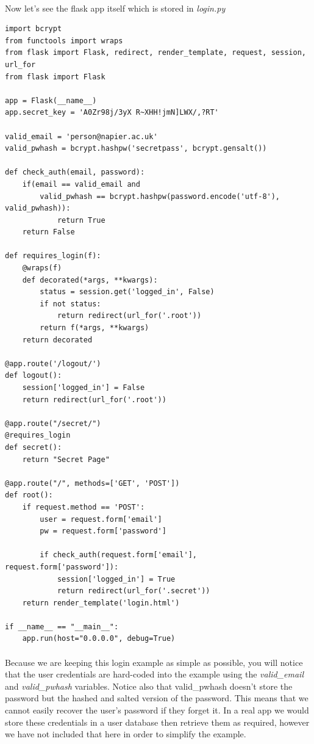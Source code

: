 \documentclass[12pt, a4paper, twoside]{book}
\begin{document}
\paragraph{} Now let's see the flask app itself which is stored in \emph{login.py}

\begin{lstlisting}
import bcrypt
from functools import wraps
from flask import Flask, redirect, render_template, request, session, url_for
from flask import Flask

app = Flask(__name__)
app.secret_key = 'A0Zr98j/3yX R~XHH!jmN]LWX/,?RT'

valid_email = 'person@napier.ac.uk'
valid_pwhash = bcrypt.hashpw('secretpass', bcrypt.gensalt())

def check_auth(email, password):
    if(email == valid_email and 
        valid_pwhash == bcrypt.hashpw(password.encode('utf-8'), valid_pwhash)):
            return True
    return False

def requires_login(f):
    @wraps(f)
    def decorated(*args, **kwargs):
        status = session.get('logged_in', False)
        if not status:
            return redirect(url_for('.root'))
        return f(*args, **kwargs)
    return decorated

@app.route('/logout/')
def logout():
    session['logged_in'] = False
    return redirect(url_for('.root'))

@app.route("/secret/")
@requires_login
def secret():
    return "Secret Page"

@app.route("/", methods=['GET', 'POST'])
def root():
    if request.method == 'POST':
        user = request.form['email']
        pw = request.form['password']
        
        if check_auth(request.form['email'], request.form['password']):
            session['logged_in'] = True
            return redirect(url_for('.secret'))
    return render_template('login.html')

if __name__ == "__main__":
    app.run(host="0.0.0.0", debug=True)
\end{lstlisting}

\paragraph{} Because we are keeping this login example as simple as possible, you will notice that the user credentials are hard-coded into the example using the \emph{valid\_email} and \emph{valid\_pwhash} variables. Notice also that valid\_pwhash doesn't store the password but the hashed and salted version of the password. This means that we cannot easily recover the user's password if they forget it. In a real app we would store these credentials in a user database then retrieve them as required, however we have not included that here in order to simplify the example.
\end{document}
